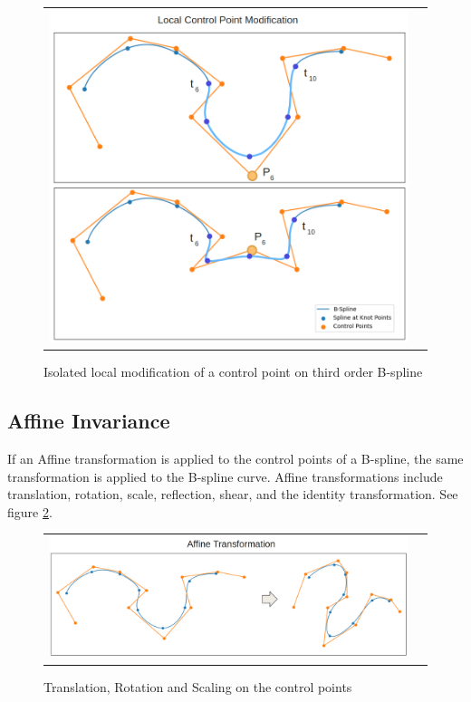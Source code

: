 \documentclass{article}
\begin{document}
     \begin{figure}[H]
    \begin{tabular}{ll}
    \includegraphics[scale=.47]{LocalMods.png}
    \end{tabular}
    \caption{Isolated local modification of a control point on third order B-spline}
    \label{Fig:LocalMod}
    \end{figure}

\clearpage

    \subsection{Affine Invariance}

    If an Affine transformation is applied to the control points of a B-spline, the same transformation is applied to the B-spline curve. Affine transformations include translation, rotation, scale, reflection, shear, and the identity transformation. See figure \ref{Fig:AffineTransformation}.
  
\begin{figure}[h]
\begin{tabular}{ll}
\includegraphics[scale=.23]{AffineTransformation.png}
\end{tabular}
\caption{Translation, Rotation and Scaling on the control points}
\label{Fig:AffineTransformation}
\end{figure}
\end{document}
